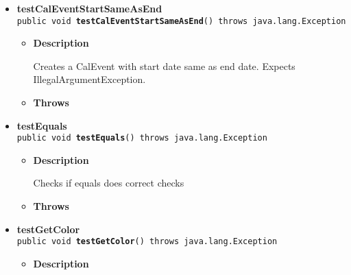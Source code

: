 \documentclass[11pt,a4paper]{report}
\begin{document}
{{{\begin{itemize}
{\begin{itemize}
{Creates a CalEvent with end date before start date. Expects IllegalArgumentException.
}
\item{{\bf  Throws}
}%
\end{itemize}
}%
\item{ 
\hypertarget{is.mpg.ruglan.test.CalEventTest.testCalEventStartSameAsEnd()}{{\bf  testCalEventStartSameAsEnd}\\}
\texttt{public void\ {\bf  testCalEventStartSameAsEnd}() throws java.lang.Exception
\label{is.mpg.ruglan.test.CalEventTest.testCalEventStartSameAsEnd()}}%
\begin{itemize}
\item{
{\bf  Description}

Creates a CalEvent with start date same as end date. Expects IllegalArgumentException.
}
\item{{\bf  Throws}
}%
\end{itemize}
}%
\item{ 
\hypertarget{is.mpg.ruglan.test.CalEventTest.testEquals()}{{\bf  testEquals}\\}
\texttt{public void\ {\bf  testEquals}() throws java.lang.Exception
\label{is.mpg.ruglan.test.CalEventTest.testEquals()}}%
\begin{itemize}
\item{
{\bf  Description}

Checks if equals does correct checks
}
\item{{\bf  Throws}
}%
\end{itemize}
}%
\item{ 
\hypertarget{is.mpg.ruglan.test.CalEventTest.testGetColor()}{{\bf  testGetColor}\\}
\texttt{public void\ {\bf  testGetColor}() throws java.lang.Exception
\label{is.mpg.ruglan.test.CalEventTest.testGetColor()}}%
\begin{itemize}
\item{
{\bf  Description}

}
\end{itemize}}
\end{itemize}}}}
\end{document}

